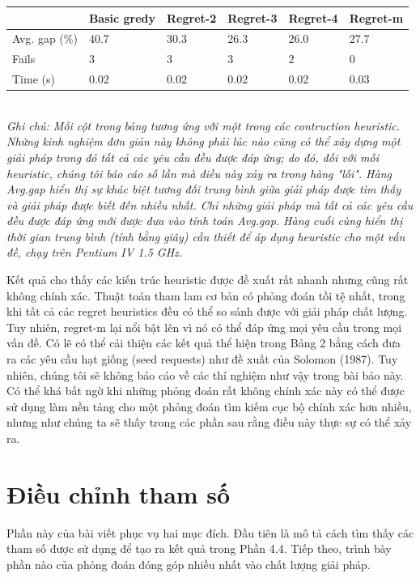 \begin{table}[caption={Performance of Construction Heuristics}, label=tab:2]
    \begin{tabular}{@{}llllll@{}}
        \toprule
                      & Basic gredy & Regret-2 & Regret-3 & Regret-4 & Regret-m \\ \midrule
        Avg. gap (\%) & 40.7        & 30.3     & 26.3     & 26.0     & 27.7     \\
        Fails         & 3           & 3        & 3        & 2        & 0        \\
        Time (s)      & 0.02        & 0.02     & 0.02     & 0.02     & 0.03     \\ \bottomrule
        \end{tabular} \\
        \justify
        \textit{Ghi chú: Mỗi cột trong bảng tương ứng với một trong các contruction heuristic. Những kinh nghiệm đơn giản này không phải lúc nào cũng có thể xây dựng một giải pháp trong đó tất cả các yêu cầu đều được đáp ứng; do đó, đối với mỗi heuristic, chúng tôi báo cáo số lần mà điều này xảy ra trong hàng "lỗi". Hàng Avg.gap hiển thị sự khác biệt tương đối trung bình giữa giải pháp được tìm thấy và giải pháp được biết đến nhiều nhất. Chỉ những giải pháp mà tất cả các yêu cầu đều được đáp ứng mới được đưa vào tính toán Avg.gap. Hàng cuối cùng hiển thị thời gian trung bình (tính bằng giây) cần thiết để áp dụng heuristic cho một vấn đề, chạy trên Pentium IV 1.5 GHz.}
\end{table}

Kết quả cho thấy các kiến trúc heuristic được đề xuất rất nhanh nhưng cũng rất không chính xác. Thuật toán tham lam cơ bản có phỏng đoán tồi tệ nhất, trong khi tất cả các regret heuristics đều có thể so sánh được với giải pháp chất lượng. Tuy nhiên, regret-m lại nổi bật lên vì nó có thể đáp ứng mọi yêu cầu trong mọi vấn đề. Có lẽ có thể cải thiện các kết quả thể hiện trong Bảng 2 bằng cách đưa ra các yêu cầu hạt giống (seed requests) như đề xuất của Solomon (1987). Tuy nhiên, chúng tôi sẽ không báo cáo về các thí nghiệm như vậy trong bài báo này. Có thể khá bất ngờ khi những phỏng đoán rất không chính xác này có thể được sử dụng làm nền tảng cho một phỏng đoán tìm kiếm cục bộ chính xác hơn nhiều, nhưng như chúng ta sẽ thấy trong các phần sau rằng điều này thực sự có thể xảy ra.


\section{Điều chỉnh tham số}
Phần này của bài viết phục vụ hai mục đích. Đầu tiên là mô tả cách tìm thấy các tham số được sử dụng để tạo ra kết quả trong Phần 4.4. Tiếp theo, trình bày phần nào của phỏng đoán đóng góp nhiều nhất vào chất lượng giải pháp.

